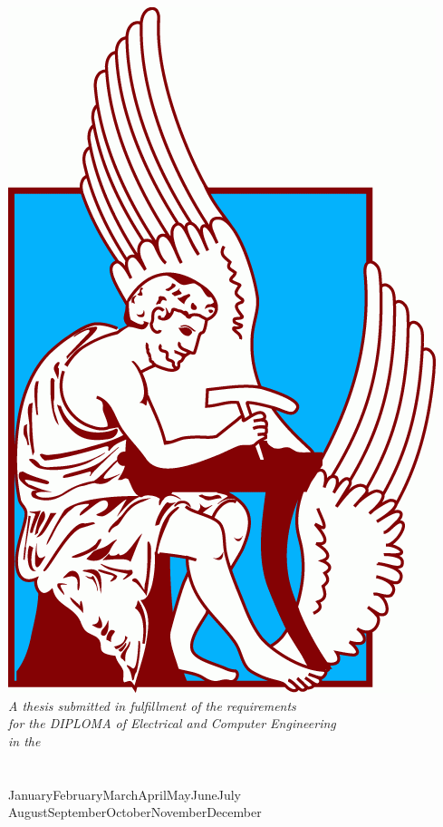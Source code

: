 \documentclass[
12pt, %
english, %
onehalfspacing,
liststotoc, %
headsepline, %
]{MastersDoctoralThesis} %
\newcommand*{\printdate}{%
   \ifcase \month\or January\or February\or March\or April\or May\or June\or July\or
    August\or September\or October\or November\or December\fi \space \number\year}
\begin{document}
\begin{titlepage}
\begin{center}
\includegraphics[scale=0.21]{Images/Tech_Crete.png} %
\\[0.5cm]

\large \textit{A thesis submitted in fulfillment of the requirements\\ for the DIPLOMA of Electrical and Computer Engineering}\\[0.1cm] %
\textit{in the}\\[0.1cm]
\deptname\\\groupname\\[0.4cm] %
 


{\large \printdate}\\[2cm] %
 
\vfill
\end{center}
\end{titlepage}
\end{document}

